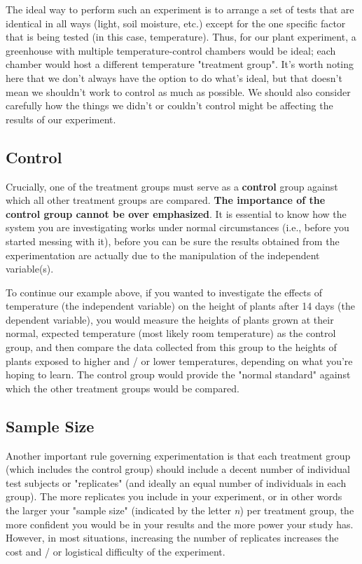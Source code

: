 \documentclass[
]{book}
\begin{document}
The ideal way to perform such an experiment is to arrange a set of tests that are identical in all ways (light, soil moisture, etc.) except for the one specific factor that is being tested (in this case, temperature). Thus, for our plant experiment, a greenhouse with multiple temperature-control chambers would be ideal; each chamber would host a different temperature "treatment group". It's worth noting here that we don't always have the option to do what's ideal, but that doesn't mean we shouldn't work to control as much as possible. We should also consider carefully how the things we didn't or couldn't control might be affecting the results of our experiment.

\hypertarget{control}{%
\subsection*{Control}\label{control}}

Crucially, one of the treatment groups must serve as a \textbf{control} group against which all other treatment groups are compared. \textbf{The importance of the control group cannot be over emphasized}. It is essential to know how the system you are investigating works under normal circumstances (i.e., before you started messing with it), before you can be sure the results obtained from the experimentation are actually due to the manipulation of the independent variable(s).

To continue our example above, if you wanted to investigate the effects of temperature (the independent variable) on the height of plants after 14 days (the dependent variable), you would measure the heights of plants grown at their normal, expected temperature (most likely room temperature) as the control group, and then compare the data collected from this group to the heights of plants exposed to higher and / or lower temperatures, depending on what you're hoping to learn. The control group would provide the "normal standard" against which the other treatment groups would be compared.

\hypertarget{sample-size}{%
\subsection*{Sample Size}\label{sample-size}}

Another important rule governing experimentation is that each treatment group (which includes the control group) should include a decent number of individual test subjects or "replicates" (and ideally an equal number of individuals in each group). The more replicates you include in your experiment, or in other words the larger your "sample size" (indicated by the letter \emph{n}) per treatment group, the more confident you would be in your results and the more power your study has. However, in most situations, increasing the number of replicates increases the cost and / or logistical difficulty of the experiment.
\end{document}

